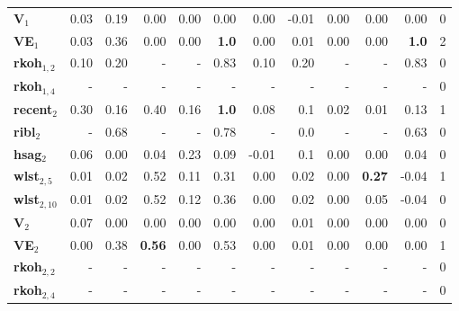 \begin{table}[t]
{\begin{tabular}[t]{@{}lrrrrrrrrrrr@{}}
			\textbf{V$_1$}				& 0.03 & 0.19 & 0.00 & 0.00 &	0.00     & 0.00 &	-0.01 &	0.00 & 0.00 & 0.00 							& 0 \\
			\textbf{VE$_1$}				& 0.03 & 0.36 & 0.00 & 0.00 & \textbf{1.0}    & 0.00 & 0.01 & 0.00 & 0.00 & \textbf{1.0}   & 2 \\
			\textbf{\gls{rkoh}$_{1,2}$} & 0.10 & 0.20 & -    & -		& 0.83						& 0.10 & 0.20 & -		 & -		& 0.83					 & 0 \\
			\textbf{\gls{rkoh}$_{1,4}$} & - & -         &     -   	& -         &  - 	 & -   & -  & - 			&  -  & - & 0 \\
			\midrule
			\textbf{\gls{recent}$_2$}   & 0.30 & 0.16 & 0.40 & 0.16 & \textbf{1.0}    & 0.08 & 0.1 & 0.02 & 0.01 & 0.13     & 1 \\
			\textbf{\gls{ribl}$_2$}     & - 	 & 0.68 & -		 & -		& 0.78						& -		 & 0.0 & -		& -		 & 0.63			& 0 \\
			\textbf{\gls{hsag}$_2$}			& 0.06 & 0.00 & 0.04 & 0.23 & 0.09						& -0.01& 0.1 & 0.00 & 0.00 & 0.04			& 0 \\
			\textbf{\gls{wlst}$_{2,5}$} & 0.01 & 0.02 & 0.52 & 0.11 & 0.31						& 0.00 & 0.02 & 0.00 & \textbf{0.27} & -0.04     & 1 \\
			\textbf{\gls{wlst}$_{2,10}$}& 0.01 & 0.02 & 0.52 & 0.12 & 0.36						& 0.00 & 0.02 & 0.00 & 0.05 & -0.04				& 0 \\
			\textbf{V$_2$}				& 0.07 & 0.00 & 0.00 & 0.00 & 0.00						& 0.00 & 0.01 & 0.00 & 0.00 & 0.00				& 0 \\
			\textbf{VE$_2$}				& 0.00 & 0.38 & \textbf{0.56} & 0.00 & 0.53   & 0.00 & 0.01 & 0.00 & 0.00 & 0.00				& 1 \\
			\textbf{\gls{rkoh}$_{2,2}$}  & -  & -         &  -      	& -         &  - 	 & -   & -  & - 			& -  & - & 0 \\
			\textbf{\gls{rkoh}$_{2,4}$}    & - & -         &     -   	& -         &  - 	 & -   & -  & - 			&  -  & - & 0   \\
			\bottomrule

		\end{tabular}
	}
\end{table}





